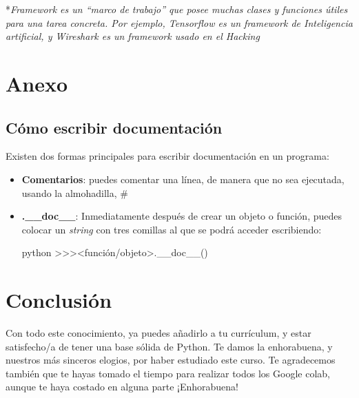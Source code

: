 \documentclass{article}
\begin{document}
*\textit{Framework es un ``marco de trabajo'' que posee muchas clases y funciones útiles para una tarea concreta. Por ejemplo, Tensorflow es un framework de Inteligencia artificial, y Wireshark es un framework usado en el Hacking}
\section{Anexo}
\subsection{Cómo escribir documentación}
Existen dos formas principales para escribir documentación en un programa:
\begin{itemize}
    \item \textbf{Comentarios}: puedes comentar una línea, de manera que no sea ejecutada, usando la almohadilla, \#
    \item \textbf{.\_\_doc\_\_}: Inmediatamente después de crear un objeto o función, puedes colocar un \textit{string} con tres comillas al que se podrá acceder escribiendo:
    \begin{mintedbox}{python}
    >>><función/objeto>.__doc__()
    \end{mintedbox}
\end{itemize}
\section{Conclusión}
Con todo este conocimiento, ya puedes añadirlo a tu currículum, y estar satisfecho/a de tener una base sólida de Python. Te damos la enhorabuena, y nuestros más sinceros elogios, por haber estudiado este curso. Te agradecemos también que te hayas tomado el tiempo para realizar todos los Google colab, aunque te haya costado en alguna parte ¡Enhorabuena!
\end{document}

